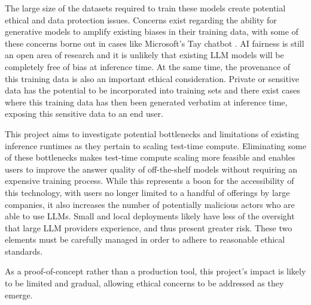 \documentclass[12pt,twoside]{report}
\begin{document}
The large size of the datasets required to train these models create potential ethical and data protection issues.
Concerns exist regarding the ability for generative models to amplify existing biases in their training data, with some of these concerns borne out in cases like Microsoft's Tay chatbot \cite{tayMicrosoft}.
AI fairness is still an open area of research \cite{xivuri2021systematic} and it is unlikely that existing LLM models will be completely free of bias at inference time.
At the same time, the provenance of this training data is also an important ethical consideration.
Private or sensitive data has the potential to be incorporated into training sets and there exist cases \cite{nasr2023scalable} where this training data has then been generated verbatim at inference time, exposing this sensitive data to an end user.

This project aims to investigate potential bottlenecks and limitations of existing inference runtimes as they pertain to scaling test-time compute.
Eliminating some of these bottlenecks makes test-time compute scaling more feasible and enables users to improve the answer quality of off-the-shelf models without requiring an expensive training process.
While this represents a boon for the accessibility of this technology, with users no longer limited to a handful of offerings by large companies, it also increases the number of potentially malicious actors who are able to use LLMs.
Small and local deployments likely have less of the oversight that large LLM providers experience, and thus present greater risk.
These two elements must be carefully managed in order to adhere to reasonable ethical standards.

As a proof-of-concept rather than a production tool, this project’s impact is likely to be limited and gradual, allowing ethical concerns to be addressed as they emerge.
\end{document}
